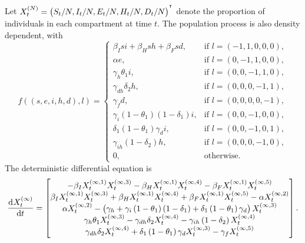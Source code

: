 Let \(X_t^{(N)} = \left(S_t / N, I_t / N, E_t / N, H_t / N, D_t / N\right)^{^{\intercal}}\) denote the proportion of individuals in each compartment at time \(t\).
The population process is also density dependent, with
\[
	f\!\left(\left(s, e, i, h, d\right), l\right) = \begin{cases}
		\beta_I s i + \beta_H sh + \beta_F sd,                        & \text{if } l = \left(-1, 1, 0, 0, 0\right), \\
		\alpha e,                                                     & \text{if } l = \left(0, -1, 1, 0, 0\right), \\
		\gamma_h \theta_1 i,                                          & \text{if } l = \left(0, 0, -1, 1, 0\right), \\
		\gamma_{dh}\delta_2 h,                                        & \text{if } l = \left(0, 0, 0, -1, 1\right), \\
		\gamma_f d,                                                   & \text{if } l = \left(0, 0, 0, 0, -1\right), \\
		\gamma_i\left(1 - \theta_1\right)\left(1 - \delta_1\right) i, & \text{if } l = \left(0,0,-1,0,0\right),     \\
		\delta_1\left(1 - \theta_1\right)\gamma_d i,                  & \text{if } l = \left(0,0,-1,0,1\right),     \\
		\gamma_{ih}\left(1 - \delta_2\right)h,                        & \text{if } l = \left(0,0,0,-1,0\right),     \\
		0,                                                            & \text{otherwise}.
	\end{cases}
\]
The deterministic differential equation is
\[
	\dod{X_t^{(\infty)}}{t} = \begin{bmatrix}
		-\beta_I X_t^{(\infty, 1)}X_t^{(\infty, 3)} - \beta_H X_t^{(\infty, 1)}X_t^{(\infty, 4)} - \beta_F X_t^{(\infty, 1)}X_t^{(\infty,5)}                                        \\
		\beta_I X_t^{(\infty, 1)}X_t^{(\infty, 3)} + \beta_H X_t^{(\infty, 1)}X_t^{(\infty, 4)} + \beta_F X_t^{(\infty, 1)}X_t^{(\infty,5)} - \alpha X_t^{(\infty, 2)}              \\
		\alpha X_t^{(\infty, 2)} - \left(\gamma_h + \gamma_i\left(1 - \theta_1\right)\left(1 - \delta_1\right) + \delta_1\left(1 - \theta_1\right)\gamma_d\right) X_t^{(\infty, 3)} \\
		\gamma_h\theta_1 X_t^{(\infty, 3)} - \gamma_{dh}\delta_2 X_t^{(\infty, 4)} - \gamma_{ih}\left(1 - \delta_2\right)X_t^{(\infty,4)}                                           \\
		\gamma_{dh}\delta_2 X_t^{(\infty, 4)} + \delta_1\left(1 - \theta_1\right)\gamma_d X_t^{(\infty, 3)} - \gamma_f X_t^{(\infty, 5)}
	\end{bmatrix}.
\]




